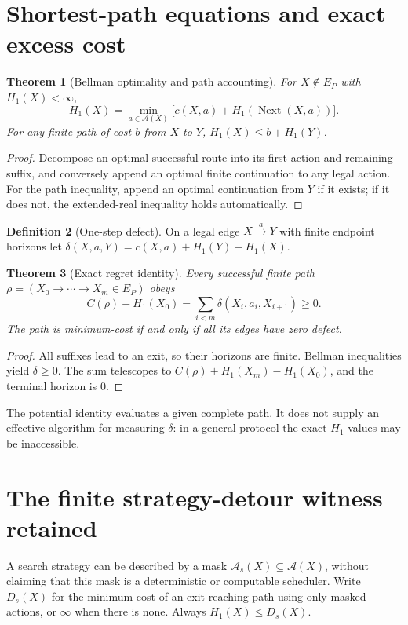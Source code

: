 \documentclass[11pt,letterpaper]{article}
\newtheorem{theorem}{Theorem}[section]
\theoremstyle{definition}
\newtheorem{definition}[theorem]{Definition}
\theoremstyle{remark}
\newcommand{\Next}{\operatorname{Next}}
\newcommand{\Exit}{E_{P}}
\newcommand{\Hone}{H_{1}}
\newcommand{\Dst}{D_{s}}
\newcommand{\acts}{\mathcal{A}}
\newcommand{\actsS}{\mathcal{A}_{s}}
\begin{document}
\section{Shortest-path equations and exact excess cost}
\begin{theorem}[Bellman optimality and path accounting]\label{thm:B_bell}
For $X\notin\Exit$ with $\Hone(X)<\infty$,
\[
 \Hone(X)=\min_{a\in\acts(X)}\bigl[c(X,a)+\Hone(\Next(X,a))\bigr].
\]
For any finite path of cost $b$ from $X$ to $Y$, $\Hone(X)\le b+\Hone(Y)$.
\end{theorem}
\begin{proof}
Decompose an optimal successful route into its first action and remaining suffix, and conversely append an optimal finite continuation to any legal action. For the path inequality, append an optimal continuation from $Y$ if it exists; if it does not, the extended-real inequality holds automatically.
\end{proof}

\begin{definition}[One-step defect]
On a legal edge $X\xrightarrow{a}Y$ with finite endpoint horizons let $\delta(X,a,Y)=c(X,a)+\Hone(Y)-\Hone(X)$.
\end{definition}
\begin{theorem}[Exact regret identity]\label{thm:B_regret}
Every successful finite path $\rho=(X_0\to\cdots\to X_m\in\Exit)$ obeys
\[
 C(\rho)-\Hone(X_0)=\sum_{i<m}\delta(X_i,a_i,X_{i+1})\ge0.
\]
The path is minimum-cost if and only if all its edges have zero defect.
\end{theorem}
\begin{proof}
All suffixes lead to an exit, so their horizons are finite. Bellman inequalities yield $\delta\ge0$. The sum telescopes to $C(\rho)+\Hone(X_m)-\Hone(X_0)$, and the terminal horizon is $0$.
\end{proof}

The potential identity evaluates a given complete path. It does not supply an effective algorithm for measuring $\delta$: in a general protocol the exact $\Hone$ values may be inaccessible.

\section{The finite strategy-detour witness retained}
A search strategy can be described by a mask $\actsS(X)\subseteq\acts(X)$, without claiming that this mask is a deterministic or computable scheduler. Write $\Dst(X)$ for the minimum cost of an exit-reaching path using only masked actions, or $\infty$ when there is none. Always $\Hone(X)\le\Dst(X)$.
\end{document}
